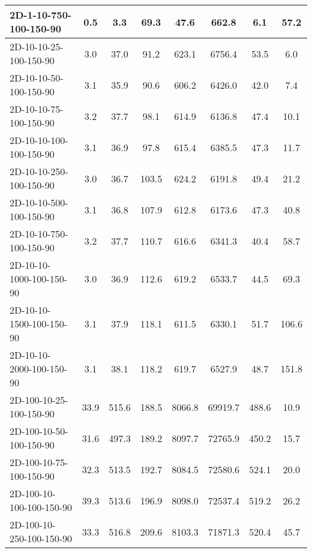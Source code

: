\documentclass{article}
\begin{document}
\begin{center}
\begin{table}[h]
\begin{tabular}{|l||c|c|c|c|c|c|c|}
            2D-1-10-750-100-150-90         & 0.5  & 3.3       & 69.3       & 47.6        & 662.8    & 6.1       & 57.2       \\
            \hline
            2D-10-10-25-100-150-90         & 3.0  & 37.0      & 91.2       & 623.1       & 6756.4   & 53.5      & 6.0        \\
            2D-10-10-50-100-150-90         & 3.1  & 35.9      & 90.6       & 606.2       & 6426.0   & 42.0      & 7.4        \\
            2D-10-10-75-100-150-90         & 3.2  & 37.7      & 98.1       & 614.9       & 6136.8   & 47.4      & 10.1       \\
            2D-10-10-100-100-150-90        & 3.1  & 36.9      & 97.8       & 615.4       & 6385.5   & 47.3      & 11.7       \\
            2D-10-10-250-100-150-90        & 3.0  & 36.7      & 103.5      & 624.2       & 6191.8   & 49.4      & 21.2       \\
            2D-10-10-500-100-150-90        & 3.1  & 36.8      & 107.9      & 612.8       & 6173.6   & 47.3      & 40.8       \\
            2D-10-10-750-100-150-90        & 3.2  & 37.7      & 110.7      & 616.6       & 6341.3   & 40.4      & 58.7       \\
            2D-10-10-1000-100-150-90       & 3.0  & 36.9      & 112.6      & 619.2       & 6533.7   & 44.5      & 69.3       \\
            2D-10-10-1500-100-150-90       & 3.1  & 37.9      & 118.1      & 611.5       & 6330.1   & 51.7      & 106.6      \\
            2D-10-10-2000-100-150-90       & 3.1  & 38.1      & 118.2      & 619.7       & 6527.9   & 48.7      & 151.8      \\
            \hline
            2D-100-10-25-100-150-90        & 33.9 & 515.6     & 188.5      & 8066.8      & 69919.7  & 488.6     & 10.9       \\
            2D-100-10-50-100-150-90        & 31.6 & 497.3     & 189.2      & 8097.7      & 72765.9  & 450.2     & 15.7       \\
            2D-100-10-75-100-150-90        & 32.3 & 513.5     & 192.7      & 8084.5      & 72580.6  & 524.1     & 20.0       \\
            2D-100-10-100-100-150-90       & 39.3 & 513.6     & 196.9      & 8098.0      & 72537.4  & 519.2     & 26.2       \\
            2D-100-10-250-100-150-90       & 33.3 & 516.8     & 209.6      & 8103.3      & 71871.3  & 520.4     & 45.7       \\

\end{tabular}
\end{table}
\end{center}
\end{document}
